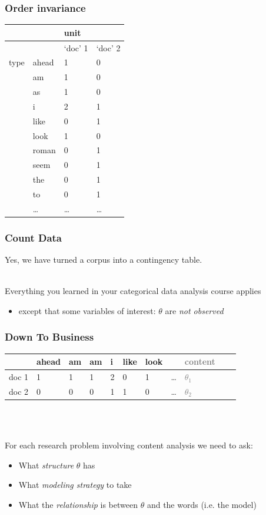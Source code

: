 \documentclass[11pt,compress,professionalfonts]{beamer}
\newcommand{\ita}{\begin{itemize}}
\newcommand{\itm}{\item[]}
\newcommand{\itz}{\end{itemize}}
\begin{document}
\begin{frame}[t]\frametitle{Order invariance}

\begin{center}
\small
\begin{tabular}{rlll}\toprule
&         & unit    & \\ \midrule
&         & `doc' 1 & `doc' 2 \\ \midrule
type      & ahead   & 1    & 0 \\
& am      & 1    & 0 \\
& as      & 1    & 0 \\
& i       & 2    & 1 \\
& like    & 0    & 1\\
& look    & 1    & 0 \\
& roman   & 0    & 1 \\
& seem    & 0    & 1 \\
& the     & 0    & 1 \\
& to      & 0    & 1\\
& \ldots  & \ldots & \ldots \\ \bottomrule
\end{tabular}
\normalsize
\end{center}

\end{frame}
\begin{frame}[t]\frametitle{Count Data}

Yes, we have turned a corpus into a contingency table.

~\\
Everything you learned in your categorical data analysis course applies
\ita
\itm except that some variables of interest: $\theta$ are \textit{not observed}
\itz


\end{frame}
\begin{frame}[t]\frametitle{Down To Business}

\begin{center}
\small
\begin{tabular}{rllllllllll}\toprule
& ahead & am & am & i & like & look &  & \textcolor{gray}{content} \\ \midrule
doc 1  & 1     & 1  & 1  & 2 & 0    & 1    & \ldots & \textcolor{gray}{$\theta_1$} \\
doc 2  & 0     & 0  & 0  & 1 & 1    & 0    & \ldots & \textcolor{gray}{$\theta_2$} \\ \bottomrule
\end{tabular}
\normalsize
\end{center}
~\\\

For each research problem involving content analysis we need to ask:
\ita
\itm What \textit{structure} $\theta$ has
\itm What \textit{modeling strategy} to take
\itm What the \textit{relationship} is between $\theta$ and the words (i.e. the model)
\itz

\end{frame}
\end{document}
